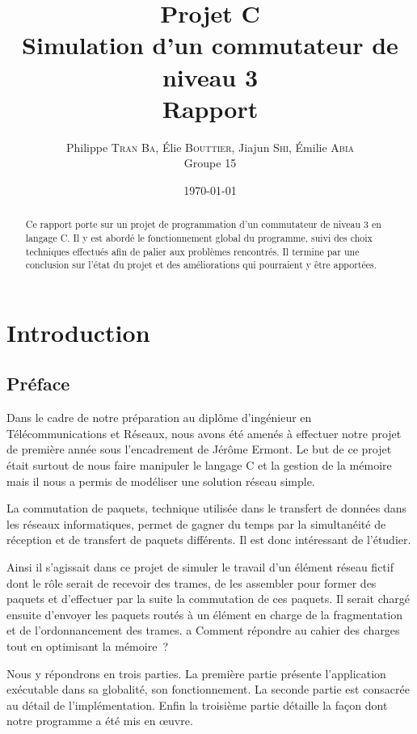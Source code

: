 \documentclass[a4paper,11pt]{article}
\title{Projet C\\Simulation d'un commutateur de niveau 3\\Rapport}
\author{Philippe \textsc{Tran Ba}, Élie \textsc{Bouttier}, Jiajun \textsc{Shi}, Émilie \textsc{Abia}\\Groupe 15}
\date\today
\begin{document}
\maketitle

\begin{abstract}

Ce rapport porte sur un projet de programmation d'un commutateur de niveau 3 en langage C. Il y est abordé le fonctionnement global du programme, suivi des choix techniques effectués afin de palier aux problèmes rencontrés. Il termine par une conclusion sur l'état du projet et des améliorations qui pourraient y être apportées.

\end{abstract}

\tableofcontents

\newpage

\section{Introduction}
\subsection{Préface}

Dans le cadre de notre préparation au diplôme d'ingénieur en Télécommunications et Réseaux, nous avons été amenés à effectuer notre projet de première année sous l'encadrement de Jérôme Ermont. Le but de ce projet était surtout de nous faire manipuler le langage C et la gestion de la mémoire mais il nous a permis de modéliser une solution réseau simple.

La commutation de paquets, technique utilisée dans le transfert de données dans les réseaux informatiques, permet de gagner du temps par la simultanéité de réception et de transfert de paquets différents. Il est donc intéressant de l'étudier. 

Ainsi il s'agissait dans ce projet de simuler le travail d'un élément réseau fictif dont le rôle serait de recevoir des trames, de les assembler pour former des paquets et d'effectuer par la suite la commutation de ces paquets. Il serait chargé ensuite d'envoyer les paquets routés à un élément en charge de la fragmentation et de l'ordonnancement des trames.
a
Comment répondre au cahier des charges tout en optimisant la mémoire ? 

Nous y répondrons en trois parties. La première partie présente l'application exécutable dans sa globalité, son fonctionnement. La seconde partie est consacrée au détail de l'implémentation. Enfin la troisième partie détaille la façon dont notre programme a été mis en œuvre.
\end{document}
